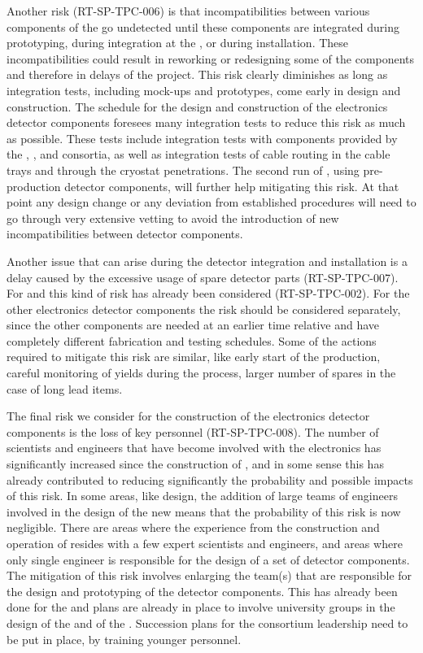 Another risk (RT-SP-TPC-006) is that incompatibilities 
between various components of the   go undetected until
these components are integrated during prototyping, during integration at 
the , or during installation. These incompatibilities could 
result in reworking or redesigning some of the components and therefore in
delays of the project. This risk clearly
diminishes as long as integration tests, including mock-ups and prototypes,
come early in design and construction. The schedule for the 
design and construction of the  electronics detector components foresees many
integration tests to reduce this risk as much as possible. These tests include 
integration tests with components provided by the , , 
and  consortia, as well as integration tests of cable routing in 
the cable trays and through the cryostat penetrations. The second run of 
, using pre-production detector components, will further help
mitigating this risk. At that point any design change or any deviation from
established procedures will need to go through very extensive vetting to
avoid the introduction of new incompatibilities between detector components.

Another issue that can arise during the detector integration and installation
is a delay caused by the excessive usage of spare detector parts (RT-SP-TPC-007).
For  and  this kind of risk has already been considered
(RT-SP-TPC-002). For the other  electronics detector components the
risk should be considered separately, since the other components are needed 
at an earlier time relative and have completely different fabrication and
testing schedules. Some of the actions required to mitigate this risk are
similar, like early start of the production, careful monitoring of yields
during the  process, larger number of spares in the case of
long lead items. 

The final risk we consider for the construction of the  electronics
detector components is the loss of key personnel (RT-SP-TPC-008). The number of
scientists and engineers that have become involved with the 
electronics has significantly increased since the construction of ,
and in some sense this has already contributed to reducing significantly the
probability and possible impacts of this risk. In some areas, like 
design, the addition of large teams of engineers involved in the design of
the new  means that the probability of this risk is now negligible.
There are areas where the experience from the construction and operation
of  resides with a few expert scientists and engineers, and areas
where only single engineer is responsible for the design of a set of detector
components. The mitigation of this risk involves enlarging the team(s) that
are responsible for the design and prototyping of the detector components.
This has already been done for the  and plans are already 
in place to involve university groups in the design of the 
and of the . Succession plans for the consortium leadership
need to be put in place, by training younger personnel. 


